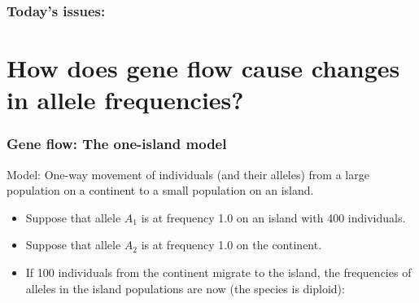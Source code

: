 \begin{noheadline}
\begin{frame}
\frametitle{Today's issues:}
\vspace{5mm}
\tableofcontents[subsectionstyle=hide]
\end{frame}
\end{noheadline}

\section[How gene flow changes allele frequencies]{How does gene flow cause
    changes in allele frequencies?}

\begin{frame}[t]
    \frametitle{Gene flow: The one-island model}
    \begin{adjustwidth}{-1.5em}{-1.5em}
        \vspace{-4mm}
        Model: One-way movement of individuals (and their alleles) from a large
        population on a continent to a small population on an island.

        \begin{itemize}
            \item<2-> Suppose that allele $A_1$ is at frequency 1.0 on an
                island with 400 individuals.

            \item<3-> Suppose that allele $A_2$ is at frequency 1.0 on the
                continent.

            \item<4-> If 100 individuals from the continent migrate to the
                island, the frequencies of alleles in the island populations
                are now (the species is diploid):
        \end{itemize}


    

    \end{adjustwidth}
\end{frame}

